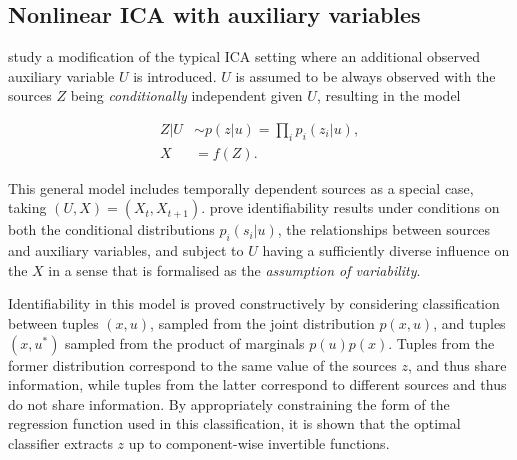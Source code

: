 





\subsection{Nonlinear ICA with auxiliary variables}\label{subsec:ica-literature-nonlinear-ica-with-aux}

\cite{hyvarinen19a} study a modification of the typical ICA setting where an additional observed auxiliary variable $U$ is introduced.
$U$ is assumed to be always observed with the sources $Z$ being \emph{conditionally} independent given $U$, resulting in the model


\begin{align}
Z | U &\sim p(z|u) = \prod_{i} p_i(z_i | u), \\
X &= f(Z).
\end{align}

This general model includes temporally dependent sources as a special case, taking $(U, X)= (X_t,X_{t+1})$.
\cite{hyvarinen19a} prove identifiability results under conditions on both the conditional distributions $p_i(s_i | u)$, the relationships between sources and auxiliary variables, and subject to $U$ having a sufficiently diverse influence on the $X$ in a sense that is formalised as the \emph{assumption of variability}.

Identifiability in this model is proved constructively by considering classification between tuples $(x, u)$, sampled from the joint distribution $p(x, u)$, and tuples $(x, u^*)$ sampled from the product of marginals $p(u)p(x)$.
Tuples from the former distribution correspond to the same value of the sources $z$, and thus share information, while tuples from the latter correspond to different sources and thus do not share information.
By appropriately constraining the form of the regression function used in this classification, it is shown that the optimal classifier extracts $z$ up to component-wise invertible functions.

